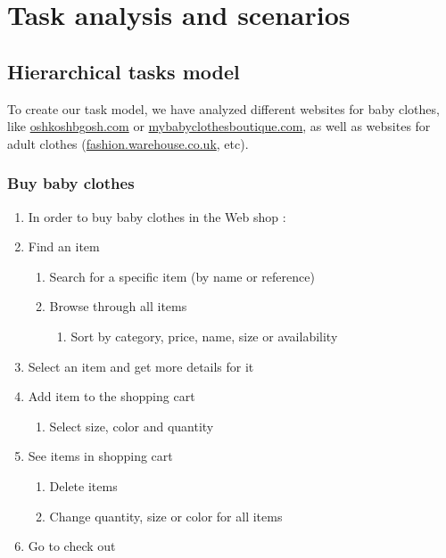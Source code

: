 \section{Task analysis and scenarios}
\subsection{Hierarchical tasks model}
To create our task model, we have analyzed different websites for baby clothes, like \url{oshkoshbgosh.com} or \url{mybabyclothesboutique.com}, as well as websites for adult clothes (\url{fashion.warehouse.co.uk}, etc).

\subsubsection{Buy baby clothes}
\begin{enumerate}[label*=\arabic*.,start=0,itemsep=-5pt]
  \item In order to buy baby clothes in the Web shop :
  \item Find an item 
    \begin{enumerate}[label*=\arabic*.,itemsep=-5pt]
      \item Search for a specific item (by name or reference)
      \item Browse through all items
				\begin{enumerate}[label*=\arabic*.,itemsep=-5pt]
				  \item Sort by category, price, name, size or availability
        \end{enumerate}
    \end{enumerate}
  \item Select an item and get more details for it
  \item Add item to the shopping cart
    \begin{enumerate}[label*=\arabic*.,itemsep=-5pt]
      \item Select size, color and quantity
    \end{enumerate}
  \item See items in shopping cart
    \begin{enumerate}[label*=\arabic*.,itemsep=-5pt]
      \item Delete items
      \item Change quantity, size or color for all items
    \end{enumerate}
  \item Go to check out
    \begin{enumerate}[label*=\arabic*.,itemsep=-5pt]

\end{enumerate}
\end{enumerate}
